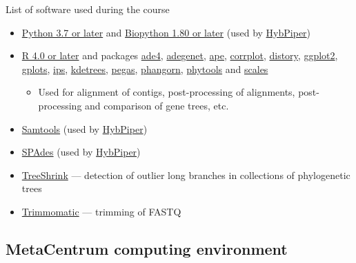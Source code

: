 \documentclass[compress,  xelatex, 11pt, xcolor=x11names, aspectratio=169,
	hyperref={
		bookmarks=true,
		unicode=true,
		colorlinks=true,
		pdftitle={HybSeq course},
		plainpages=false,
		pdfauthor={Vojtech Zeisek},
		pdfsubject={Practical processing of HybSeq target enrichment sequencing data on computing grids like MetaCentrum},
		pdfcreator={XeLaTeX},
		pdfkeywords={BASH, command line, GNU, HybSeq, Linux, MetaCentrum, sequencing shell, target enrichment},
		linkcolor=Turquoise4, %
		anchorcolor=DodgerBlue4, %
		citecolor=DodgerBlue4, %
		filecolor=DodgerBlue4, %
		menucolor=Tan4, %
		urlcolor=DarkOliveGreen4 %
		},
	url={hyphens, lowtilde} %
	]{beamer}
\begin{document}
\begin{frame}[allowframebreaks]{List of software used during the course}
\begin{itemize}
		\item \href{https://www.python.org/}{Python 3.7 or later} and \href{https://biopython.org/}{Biopython 1.80 or later} (used by \href{https://github.com/mossmatters/HybPiper/wiki}{HybPiper})
		\item \href{https://www.r-project.org/}{R 4.0 or later} and packages \href{https://cran.r-project.org/package=ade4}{ade4}, \href{https://cran.r-project.org/package=adegenet}{adegenet}, \href{https://cran.r-project.org/package=ape}{ape}, \href{https://cran.r-project.org/package=corrplot}{corrplot}, \href{https://cran.r-project.org/package=distory}{distory}, \href{https://cran.r-project.org/package=ggplot2}{ggplot2}, \href{https://cran.r-project.org/package=gplots}{gplots}, \href{https://cran.r-project.org/package=ips}{ips}, \href{https://github.com/V-Z/kdetrees}{kdetrees}, \href{https://cran.r-project.org/package=pegas}{pegas}, \href{https://cran.r-project.org/package=phangorn}{phangorn}, \href{https://cran.r-project.org/package=phytools}{phytools} and \href{https://cran.r-project.org/package=scales}{scales}
		\begin{itemize}
			\item Used for alignment of contigs, post-processing of alignments, post-processing and comparison of gene trees, etc.
		\end{itemize}
		\item \href{https://www.htslib.org/}{Samtools} (used by \href{https://github.com/mossmatters/HybPiper/wiki}{HybPiper})
		\item \href{https://github.com/ablab/spades}{SPAdes} (used by \href{https://github.com/mossmatters/HybPiper/wiki}{HybPiper})
		\item \href{https://github.com/uym2/TreeShrink}{TreeShrink} --- detection of outlier long branches in collections of phylogenetic trees
		\item \href{http://www.usadellab.org/cms/?page=trimmomatic}{Trimmomatic} --- trimming of FASTQ
	\end{itemize}
\end{frame}

\subsection{MetaCentrum computing environment}
\end{document}
